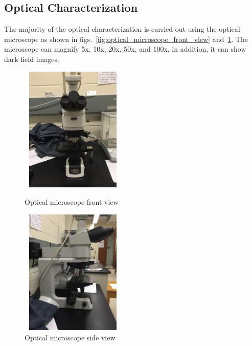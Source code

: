 \subsection{Optical Characterization}\label{subsec:characterization_optical}
The majority of the optical characterization is carried out using the optical microscope as shown in figs.~\ref{fig:optical_microscope_front_view} and~\ref{fig:optical_microscope_side_view}. The microscope can magnify 5x, 10x, 20x, 50x, and 100x, in addition, it can show dark field images.
\begin{figure}[ht]
	\centering
	\begin{minipage}[b]{0.45\linewidth}
		\centering
		\includegraphics[height=6cm,width=5cm]{figs/experimental/optical_microscope_front_view}
		\caption[Optical microscope front view]{Optical microscope front view}
		\label{fig:optical_microscope_front_view}
	\end{minipage}
	\qquad
	\begin{minipage}[b]{0.45\linewidth}
		\centering
		\includegraphics[height=6cm,width=5cm]{figs/experimental/optical_microscope_side_view}
		\caption[Optical microscope side view]{Optical microscope side view}
		\label{fig:optical_microscope_side_view}
	\end{minipage}
\end{figure}

